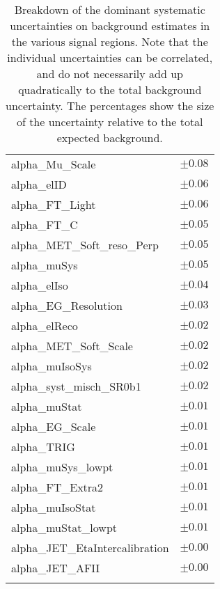 \begin{table}
\begin{center}
\begin{tabular*}{\textwidth}{@{\extracolsep{\fill}}lc}
alpha\_Mu\_Scale         & $\pm 0.08$       \\
alpha\_elID         & $\pm 0.06$       \\
alpha\_FT\_Light         & $\pm 0.06$       \\
alpha\_FT\_C         & $\pm 0.05$       \\
alpha\_MET\_Soft\_reso\_Perp         & $\pm 0.05$       \\
alpha\_muSys         & $\pm 0.05$       \\
alpha\_elIso         & $\pm 0.04$       \\
alpha\_EG\_Resolution         & $\pm 0.03$       \\
alpha\_elReco         & $\pm 0.02$       \\
alpha\_MET\_Soft\_Scale         & $\pm 0.02$       \\
alpha\_muIsoSys         & $\pm 0.02$       \\
alpha\_syst\_misch\_SR0b1         & $\pm 0.02$       \\
alpha\_muStat         & $\pm 0.01$       \\
alpha\_EG\_Scale         & $\pm 0.01$       \\
alpha\_TRIG         & $\pm 0.01$       \\
alpha\_muSys\_lowpt         & $\pm 0.01$       \\
alpha\_FT\_Extra2         & $\pm 0.01$       \\
alpha\_muIsoStat         & $\pm 0.01$       \\
alpha\_muStat\_lowpt         & $\pm 0.01$       \\
alpha\_JET\_EtaIntercalibration         & $\pm 0.00$       \\
alpha\_JET\_AFII         & $\pm 0.00$       \\
\noalign{\smallskip}\hline\noalign{\smallskip}
\end{tabular*}
\end{center}
\caption[Breakdown of uncertainty on background estimates]{
Breakdown of the dominant systematic uncertainties on background estimates in the various signal regions.
Note that the individual uncertainties can be correlated, and do not necessarily add up quadratically to 
the total background uncertainty. The percentages show the size of the uncertainty relative to the total expected background.
\label{table.results.bkgestimate.uncertainties.SR0b1}}
\end{table}
%